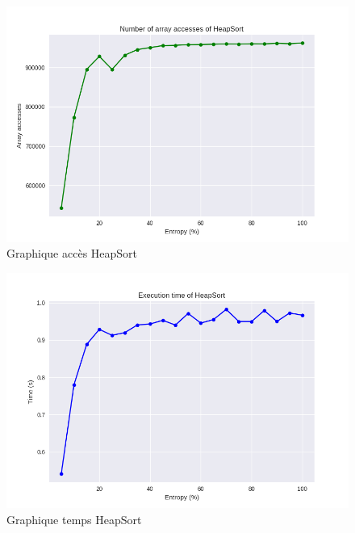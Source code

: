 \documentclass[10pt,a4paper]{article}
\begin{document}
            \begin{figure}
                \centering
                \includegraphics[width=1\textwidth]{graphique/HeapSort/GraphAccessesHeapSort.png}
                \caption{Graphique accès HeapSort}
                \label{fig:mesh1}
            \end{figure}
            \begin{figure}
                \centering
                \includegraphics[width=1\textwidth]{graphique/HeapSort/GraphTimeHeapSort.png}
                \caption{Graphique temps HeapSort}
                \label{fig:mesh1}
            \end{figure}
\end{document}
